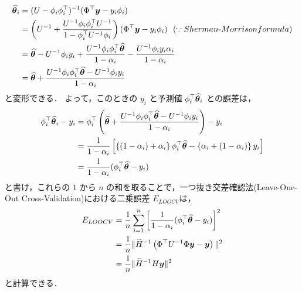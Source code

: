 \documentclass[onecolumn]{preport}
\def\vector#1{\mbox{\boldmath $#1$}}
\begin{document}
\begin{align}
  \thetil_i &= (U - \phi_i \phi_i^\top)^{-1} (\Phi^\top \vector{y} - y_i \phi_i) \\
  &= \left(U^{-1} + \frac{U^{-1} \phi_i \phi_i^\top U^{-1}}{1 - \phi_i^\top U^{-1} \phi_i}\right) (\Phi^\top \vector{y} - y_i \phi_i) \ \ (\because Sherman\mathchar`-Morrison formula)\\
  &= \thetil - U^{-1} \phii y_i + \frac{U^{-1} \phii \phii^\top \thetil}{1 - \alpha_i} - \frac{U^{-1} \phii y_i \alpha_i}{1 - \alpha_i} \\
  &= \thetil + \frac{U^{-1} \phi_i \phi_i^\top \thetil - U^{-1} \phi_i y_i}{1 - \alpha_i}
\end{align}
と変形できる．
よって，このときの \(y_i\) と予測値 \(\phii^\top \thetil_i\) との誤差は，
\begin{align}
  \phi_i^\top \thetil_i - y_i &= \phi_i^\top \left( \thetil + \frac{U^{-1} \phi_i \phi_i^\top \thetil - U^{-1} \phi_i y_i}{1 - \alpha_i} \right) - y_i \\
  &= \frac{1}{1 - \alpha_i} \left[ \left\{ (1 - \alpha_i) + \alpha_i \right\} \phi_i^\top \thetil - \left\{ \alpha_i + (1 - \alpha_i) \right\} y_i \right] \\
  &= \frac{1}{1 - \alpha_i} (\phi_i^\top \thetil - y_i)
\end{align}
と書け，これらの \(1\) から \(n\) の和を取ることで，一つ抜き交差確認法(Leave-One-Out Cross-Validation)における二乗誤差 \(E_{LOOCV}\)は，
\begin{align}
  E_{LOOCV} &= \frac{1}{n} \sum_{i=1}^{n} \left[ \frac{1}{1 - \alpha_i} (\phi_i^\top \thetil - y_i) \right]^2 \\
  &= \frac{1}{n} \| \widetilde{H}^{-1} \left( \Phi^\top U^{-1} \Phi \vector{y} - \vector{y} \right) \|^2 \\
  &= \frac{1}{n} \| \widetilde{H}^{-1} H \vector{y} \|^2
\end{align}
と計算できる．

\end{document}
